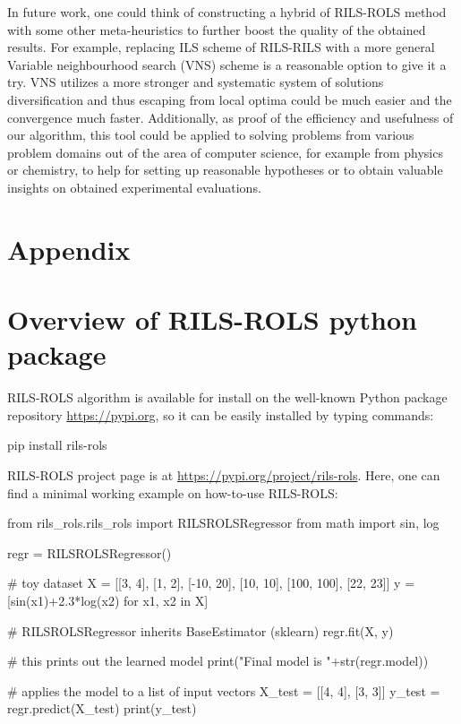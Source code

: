 \documentclass{bmcart}
\begin{document}
In future work, one could think of constructing a hybrid of \textsc{RILS-ROLS} method with some other meta-heuristics to further boost the quality of the obtained results. For example, replacing ILS scheme of \textsc{RILS-RILS} with a more general Variable neighbourhood search (VNS) scheme is a reasonable option to give it a try. VNS   utilizes a more stronger and systematic system of solutions diversification and thus escaping from local optima could be much easier and the convergence much faster.  Additionally, as proof of the efficiency and usefulness of our algorithm, this tool could be applied to solving problems from various problem domains out of the area of computer science, for example from physics or chemistry, to help for setting up reasonable hypotheses or to obtain valuable insights on obtained experimental evaluations.  




\section*{Appendix}
\section{Overview of \textsc{RILS}-\textsc{ROLS} python package}\label{sec:appendix-1}

\textsc{RILS-ROLS} algorithm is available for install on the well-known Python package repository \url{https://pypi.org}, so it can be easily installed by typing commands:
\begin{python} 
	pip install rils-rols
\end{python}
\textsc{RILS-ROLS} project page is at \url{https://pypi.org/project/rils-rols}. Here, one can find a minimal working example on how-to-use \textsc{RILS-ROLS}:

\begin{python}
	from rils_rols.rils_rols import RILSROLSRegressor
	from math import sin, log
	
	regr = RILSROLSRegressor()
	
	# toy dataset 
	X = [[3, 4], [1, 2], [-10, 20], [10, 10], [100, 100], [22, 23]]
	y = [sin(x1)+2.3*log(x2) for x1, x2 in X]
	
	# RILSROLSRegressor inherits BaseEstimator (sklearn)
	regr.fit(X, y)
	
	# this prints out the learned model
	print("Final model is "+str(regr.model))
	
	# applies the model to a list of input vectors
	X_test = [[4, 4], [3, 3]]
	y_test = regr.predict(X_test)
	print(y_test) 
\end{python}
\end{document}
